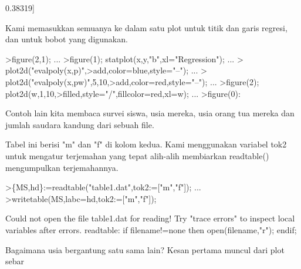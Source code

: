 \documentclass[a4paper,10pt]{article}
\begin{document}
\begin{eulernotebook}
\begin{eulercomment}
\begin{eulercomment}
\begin{eulercomment}
\begin{eulercomment}
\begin{eulercomment}
\begin{eulercomment}
\begin{eulercomment}
\begin{eulercomment}
\begin{eulercomment}
\begin{eulercomment}
\begin{eulercomment}
\begin{eulercomment}
\begin{eulercomment}
\begin{eulercomment}
\begin{eulercomment}
\begin{eulercomment}
\begin{eulercomment}
\begin{eulercomment}
\begin{eulercomment}
\begin{eulercomment}
\begin{eulercomment}
\begin{eulercomment}
\begin{eulercomment}
\begin{eulercomment}
\begin{eulercomment}
\begin{eulercomment}
\begin{eulercomment}
\begin{eulercomment}
\begin{eulercomment}
\begin{eulercomment}
\begin{eulercomment}
\begin{eulercomment}
\begin{eulercomment}
\begin{eulercomment}
\begin{eulercomment}
\begin{eulercomment}
\begin{eulercomment}
\begin{eulercomment}
\begin{eulercomment}
\begin{eulercomment}
\begin{eulercomment}
\begin{eulercomment}
\begin{eulercomment}
\begin{eulercomment}
\begin{eulercomment}
\begin{eulercomment}
\begin{eulercomment}
\begin{eulercomment}
\begin{eulercomment}
\begin{eulercomment}
\begin{eulercomment}
\begin{eulercomment}
\begin{eulercomment}
\begin{eulercomment}
\begin{eulercomment}
\begin{eulercomment}
\begin{eulercomment}
\begin{eulercomment}
\begin{eulercomment}
\begin{eulercomment}
\begin{eulercomment}
\begin{eulercomment}
\begin{eulercomment}
\begin{eulercomment}
\begin{eulercomment}
\begin{eulercomment}
\begin{euleroutput}
0.38319]
\end{euleroutput}
\begin{eulercomment}
Kami memasukkan semuanya ke dalam satu plot untuk titik dan garis
regresi, dan untuk bobot yang digunakan.
\end{eulercomment}
\begin{eulerprompt}
>figure(2,1);  ...
>figure(1); statplot(x,y,"b",xl="Regression"); ...
>  plot2d("evalpoly(x,p)",>add,color=blue,style="--"); ...
>  plot2d("evalpoly(x,pw)",5,10,>add,color=red,style="--"); ...
>figure(2); plot2d(w,1,10,>filled,style="/",fillcolor=red,xl=w); ...
>figure(0):
\end{eulerprompt}
\begin{eulercomment}
Contoh lain kita membaca survei siswa, usia mereka, usia orang tua
mereka dan jumlah saudara kandung dari sebuah file.

Tabel ini berisi "m" dan "f" di kolom kedua. Kami menggunakan variabel
tok2 untuk mengatur terjemahan yang tepat alih-alih membiarkan
readtable() mengumpulkan terjemahannya.
\end{eulercomment}
\begin{eulerprompt}
>\{MS,hd\}:=readtable("table1.dat",tok2:=["m","f"]);  ...
>writetable(MS,labc=hd,tok2:=["m","f"]);
\end{eulerprompt}
\begin{euleroutput}
  Could not open the file
  table1.dat
  for reading!
  Try "trace errors" to inspect local variables after errors.
  readtable:
      if filename!=none then open(filename,"r"); endif;
\end{euleroutput}
\begin{eulercomment}
Bagaimana usia bergantung satu sama lain? Kesan pertama muncul dari
plot sebar 
\end{eulercomment}
\end{eulercomment}
\end{eulercomment}
\end{eulercomment}
\end{eulercomment}
\end{eulercomment}
\end{eulercomment}
\end{eulercomment}
\end{eulercomment}
\end{eulercomment}
\end{eulercomment}
\end{eulercomment}
\end{eulercomment}
\end{eulercomment}
\end{eulercomment}
\end{eulercomment}
\end{eulercomment}
\end{eulercomment}
\end{eulercomment}
\end{eulercomment}
\end{eulercomment}
\end{eulercomment}
\end{eulercomment}
\end{eulercomment}
\end{eulercomment}
\end{eulercomment}
\end{eulercomment}
\end{eulercomment}
\end{eulercomment}
\end{eulercomment}
\end{eulercomment}
\end{eulercomment}
\end{eulercomment}
\end{eulercomment}
\end{eulercomment}
\end{eulercomment}
\end{eulercomment}
\end{eulercomment}
\end{eulercomment}
\end{eulercomment}
\end{eulercomment}
\end{eulercomment}
\end{eulercomment}
\end{eulercomment}
\end{eulercomment}
\end{eulercomment}
\end{eulercomment}
\end{eulercomment}
\end{eulercomment}
\end{eulercomment}
\end{eulercomment}
\end{eulercomment}
\end{eulercomment}
\end{eulercomment}
\end{eulercomment}
\end{eulercomment}
\end{eulercomment}
\end{eulercomment}
\end{eulercomment}
\end{eulercomment}
\end{eulercomment}
\end{eulercomment}
\end{eulercomment}
\end{eulercomment}
\end{eulercomment}
\end{eulercomment}
\end{eulercomment}
\end{eulernotebook}
\end{document}
